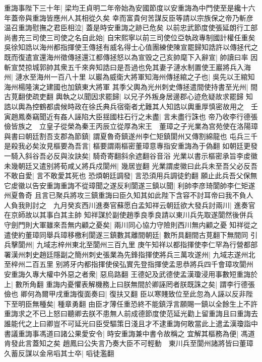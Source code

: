 重誨事陛下三十年|{
	梁均王貞明二年帝始為安國節度以安重誨為中門使至是纔十六年蓋帝與重誨皆應州人其相從久矣}
幸而富貴何苦謀反臣等請以宗族保之帝乃斬彦温召重誨慰撫之君臣相泣|{
	蓋是時安重誨之跡已危矣}
以前忠武節度使張延朗行工部尚書充三司使三司使之名自此始|{
	自宋熙寧以前三司使位亞執政專制國計權任重矣}
吳徐知誥以海州都指揮使王傳拯有威名得士心值團練使陳宣罷歸知誥許以傳拯代之既而復遣宣還海州徵傳拯還江都傳拯怒以為宣毁之己亥帥麾下入辭宣|{
	帥讀曰率}
因斬宣焚掠城郭帥其衆五千來奔知誥曰是吾過也免其妻子漣水制置使王巖將兵入海州|{
	漣水至海州一百八十里}
以巖為威衛大將軍知海州傳拯綰之子也|{
	吳先以王綰知海州楊隆演之建國也加鎮東大將軍}
其季父輿為光州刺史傳拯遣間使持書至光州|{
	間古莧翻使疏吏翻}
輿執之以聞因求罷歸|{
	以兄子外叛身居邊郡心迹危疑故求罷歸}
知誥以輿為控鶴都虞候時政在徐氏典兵宿衛者尤難其人知誥以輿重厚慎密故用之　壬寅趙鳳奏竊聞近有姦人誣陷大臣揺國柱石行之未盡|{
	言未盡行誅也}
帝乃收李行德張儉皆族之　立皇子從榮為秦王丙辰立從厚為宋王　董璋之子光業為宫苑使在洛陽璋與書曰朝廷割吾支郡為節鎮|{
	謂夏魯奇鎮遂州李仁矩鎮閬州又傳割綿龍也}
屯兵三千是殺我必矣汝見樞要為吾言|{
	樞要謂兩樞密董璋意專指安重誨為于偽翻}
如朝廷更發一騎入斜谷吾必反與汝訣矣|{
	騎奇寄翻斜余遮翻谷音浴}
光業以書示樞密承旨李䖍徽未幾朝廷又遣别將荀咸乂將兵戍閬州|{
	幾居豈翻}
光業謂䖍徽曰此兵未至吾父必反吾不敢自愛|{
	言不敢愛其死也}
恐煩朝廷調發|{
	言恐須用兵調徒釣翻}
願止此兵吾父保無它䖍徽以告安重誨重誨不從璋聞之遂反利閬遂三鎮以聞|{
	利帥李彦琦閬帥李仁矩遂州夏魯奇}
且言已聚兵將攻三鎮重誨曰臣久知其如此陛下含容不討耳帝曰我不負人人負我則討之　九月癸亥西川進奏官蘇愿白孟知祥云朝廷欲大發兵討兩川|{
	進奏官在京師故以其事白其主帥}
知祥謀於副使趙季良季良請以東川兵先取遂閬然後併兵守劍門則大軍雖來吾無内顧之憂矣|{
	兩川同心協力守險則西川無内顧之憂}
知祥從之遣使約董璋同舉兵璋移檄利閬遂三鎮數其離間朝廷|{
	數所具翻間古莧翻下無間同}
引兵擊閬州|{
	九域志梓州東北至閬州三百九里}
庚午知祥以都指揮使李仁罕為行營都部署漢州刺史趙廷隱副之簡州刺史張業為先鋒指揮使將兵三萬攻遂州|{
	九域志遂州北至梓州二百五里}
别將牙内都指揮使侯弘實先登指揮使孟思恭將兵四千會璋攻閬州　安重誨久專大權中外惡之者衆|{
	惡烏路翻}
王德妃及武德使孟漢瓊浸用事數短重誨於上|{
	數所角翻}
重誨内憂懼表解機務上曰朕無間於卿誣罔者朕既誅之矣|{
	謂李行德張儉也}
卿何為爾甲戌重誨復面奏曰|{
	復扶又翻}
臣以寒賤致位至此忽為人誣以反非陛下至明臣無種矣|{
	種章勇翻}
由臣才薄任重恐終不能鎮浮言願賜一鎮以全餘生上不許重誨求之不已上怒曰聽卿去朕不患無人前成德節度使范延光勸上留重誨且曰重誨去誰能代之上曰卿豈不可延光曰臣受驅策日淺且才不逮重誨何敢當此上遣孟漢瓊詣中書議重誨事馮道曰諸公果愛安令|{
	時安重誨兼中書令故稱之}
宜解其樞務為便|{
	馮道肯發此言蓋知之矣}
趙鳳曰公失言乃奏大臣不可輕動　東川兵至閬州諸將皆曰董璋久蓄反謀以金帛㗖其士卒|{
	㗖徒濫翻}
